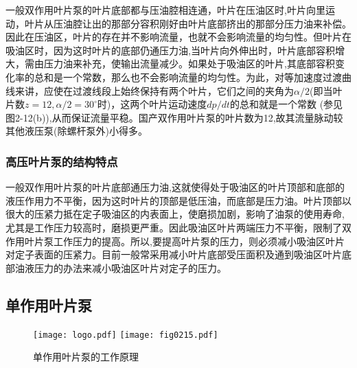 一般双作用叶片泵的叶片底部都与压油腔相连通，叶片在压油区时,叶片向里运动，叶片从压油腔让出的那部分容积刚好由叶片底部挤出的那部分压力油来补偿。因此在压油区，叶片的存在并不影响流量，也就不会影响流量的均匀性。但叶片在吸油区时，因为这时叶片的底部仍通压力油,当叶片向外伸出时，叶片底部容积增大，需由压力油来补充，使输出流量减少。如果处于吸油区的叶片,其底部容积变化率的总和是一个常数，那么也不会影响流量的均匀性。为此，对等加速度过渡曲线来讲，应使在过渡线段上始终保持有两个叶片，它们之间的夹角为$\alpha/2$(即当叶片数$z=12,\alpha/2=30^{\circ}$时)，这两个叶片运动速度$dp/dt$的总和就是一个常数 (参见图2-12(b)),从而保证流量平稳。国产双作用叶片泵的叶片数为12,故其流量脉动较其他液压泵(除螺杆泵外)小得多。

\subsubsection{高压叶片泵的结构特点}

一般双作用叶片泵的叶片底部通压力油,这就使得处于吸油区的叶片顶部和底部的液压作用力不平衡，因为这时叶片的顶部是低压油，而底部是压力油。叶片顶部以很大的压紧力抵在定子吸油区的内表面上，使磨损加剧，影响了油泵的使用寿命,尤其是工作压力较高时，磨损更严重。因此吸油区叶片两端压力不平衡，限制了双作用叶片泵工作压力的提高。所以,要提高叶片泵的压力，则必须减小吸油区叶片对定子表面的压紧力。目前一般常采用减小叶片底部受压面积及通到吸油区叶片底部油液压力的办法来减小吸油区叶片对定子的压力。

\subsection{单作用叶片泵}

\begin{figure}[!hbt]
\centering
\ifOpenSource
\texttt{[image: logo.pdf]}
\else
\texttt{[image: fig0215.pdf]}
\fi
\caption{单作用叶片泵的工作原理}
\label{fig:fig0215}
\end{figure}

